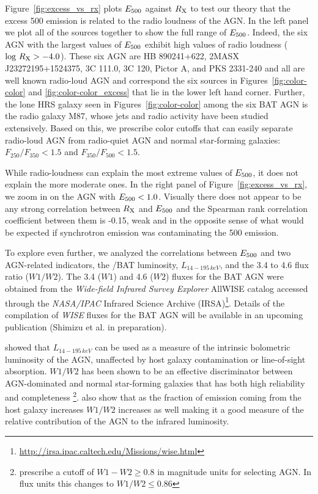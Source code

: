 Figure~\ref{fig:excess_vs_rx} plots $E_{\rm 500}$ against $R_{\rm X}$ to test our theory that the excess 500 \um{} emission is related to the radio loudness of the AGN. In the left panel we plot all of the sources together to show the full range of $E_{\rm 500}$. Indeed, the six AGN with the largest values of $E_{\rm 500}$ exhibit high values of radio loudness ($\log\,R_{\rm X} > -4.0$). These six AGN are HB 890241+622, 2MASX J23272195+1524375, 3C 111.0, 3C 120, Pictor A, and PKS 2331-240 and all are well known radio-loud AGN and correspond the six sources in Figures~\ref{fig:color-color} and \ref{fig:color-color_excess} that lie in the lower left hand corner. Further, the lone HRS galaxy seen in Figures~\ref{fig:color-color} among the six BAT AGN is the radio galaxy M87, whose jets and radio activity have been studied extensively. Based on this, we prescribe color cutoffs that can easily separate radio-loud AGN from radio-quiet AGN and normal star-forming galaxies: $F_{250}/F_{350} < 1.5$ and $F_{350}/F_{500} < 1.5$. 

While radio-loudness can explain the most extreme values of $E_{\rm 500}$, it does not explain the more moderate ones. In the right panel of Figure~\ref{fig:excess_vs_rx}, we zoom in on the AGN with $E_{\rm 500} < 1.0$. Visually there does not appear to be any strong correlation between $R_{\rm X}$ and $E_{\rm 500}$ and the Spearman rank correlation coefficient between them is -0.15, weak and in the opposite sense of what would be expected if synchrotron emission was contaminating the 500 \um{} emission.
  
To explore even further, we analyzed the correlations between $E_{\rm 500}$ and two AGN-related indicators, the \swift/BAT luminosity, $L_{14-195\,keV}$, and the 3.4 to 4.6 \um{} flux ratio ($W1/W2$). The 3.4 ($W1$) and 4.6 ($W2$) \um{} fluxes for the BAT AGN were obtained from the \textit{Wide-field Infrared Survey Explorer} \citep[\textit{WISE};][]{Wright:2010fk} AllWISE catalog accessed through the \textit{NASA/IPAC} Infrared Science Archive (IRSA)\footnote{\url{http://irsa.ipac.caltech.edu/Missions/wise.html}}. Details of the compilation of \textit{WISE} fluxes for the BAT AGN will be available in an upcoming publication (Shimizu et al. in preparation).

\citet{Winter:2012yq} showed that $L_{14-195\,keV}$ can be used as a measure of the intrinsic bolometric luminosity of the AGN, unaffected by host galaxy contamination or line-of-sight absorption. $W1/W2$ has been shown to be an effective discriminator between AGN-dominated and normal star-forming galaxies that has both high reliability and completeness \citep{Stern:2012mz}\footnote{\citet{Stern:2012mz} prescribe a cutoff of $W1 - W2 \geq 0.8$  in magnitude units for selecting AGN. In flux units this changes to $W1/W2 \leq 0.86$}. \citet{Stern:2012mz} also show that as the fraction of emission coming from the host galaxy increases $W1/W2$ increases as well making it a good measure of the relative contribution of the AGN to the infrared luminosity. 
  